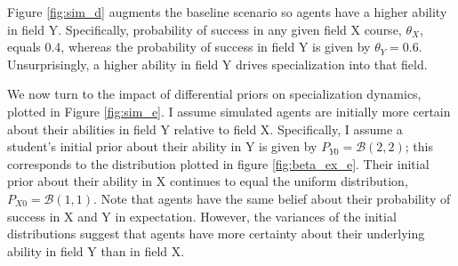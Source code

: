 


Figure \ref{fig:sim_d} augments the baseline scenario so agents have a higher ability in field Y. 
Specifically, probability of success in any given field X course, $\theta_X$, equals 0.4, whereas the probability of success in field Y is given by $\theta_Y = 0.6$. 
Unsurprisingly, a higher ability in field Y drives specialization into that field.

We now turn to the impact of differential priors on specialization dynamics, plotted in Figure \ref{fig:sim_e}.
I assume simulated agents are initially more certain about their abilities in field Y relative to field X.
Specifically, I assume a student's initial prior about their ability in Y is given by $P_{Y0} = \mathcal{B} (2, 2)$; this corresponds to the distribution plotted in figure \ref{fig:beta_ex_e}.
Their initial prior about their ability in X continues to equal the uniform distribution, $P_{X0} = \mathcal{B} (1, 1)$.
Note that agents have the same belief about their probability of success in X and Y in expectation. 
However, the variances of the initial distributions suggest that agents have more certainty about their underlying ability in field Y than in field X.

